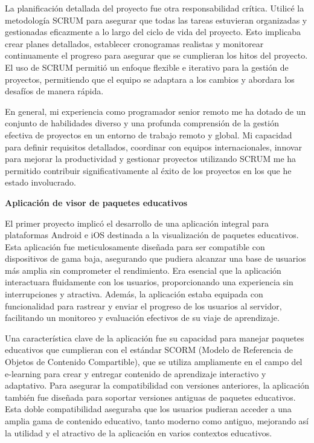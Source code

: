\documentclass[a4paper,10pt]{article}
\newcommand{\cvsubsubsection}[1]{
\begin{tcolorbox}[colback=gray!10, colframe=gray!10, boxrule=0pt, arc=0mm, outer arc=0mm, width=\textwidth, boxsep=0pt, left=4mm, right=4mm, top=1mm, bottom=1mm]
  \textbf{#1}
\end{tcolorbox}
\vspace{1mm}
}
\begin{document}
La planificación detallada del proyecto fue otra responsabilidad crítica. Utilicé la metodología SCRUM para asegurar que todas las tareas estuvieran organizadas y gestionadas eficazmente a lo largo del ciclo de vida del proyecto. Esto implicaba crear planes detallados, establecer cronogramas realistas y monitorear continuamente el progreso para asegurar que se cumplieran los hitos del proyecto. El uso de SCRUM permitió un enfoque flexible e iterativo para la gestión de proyectos, permitiendo que el equipo se adaptara a los cambios y abordara los desafíos de manera rápida.

En general, mi experiencia como programador senior remoto me ha dotado de un conjunto de habilidades diverso y una profunda comprensión de la gestión efectiva de proyectos en un entorno de trabajo remoto y global. Mi capacidad para definir requisitos detallados, coordinar con equipos internacionales, innovar para mejorar la productividad y gestionar proyectos utilizando SCRUM me ha permitido contribuir significativamente al éxito de los proyectos en los que he estado involucrado.

\cvsubsubsection{Aplicación de visor de paquetes educativos}
El primer proyecto implicó el desarrollo de una aplicación integral para plataformas Android e iOS destinada a la visualización de paquetes educativos. Esta aplicación fue meticulosamente diseñada para ser compatible con dispositivos de gama baja, asegurando que pudiera alcanzar una base de usuarios más amplia sin comprometer el rendimiento. Era esencial que la aplicación interactuara fluidamente con los usuarios, proporcionando una experiencia sin interrupciones y atractiva. Además, la aplicación estaba equipada con funcionalidad para rastrear y enviar el progreso de los usuarios al servidor, facilitando un monitoreo y evaluación efectivos de su viaje de aprendizaje.

Una característica clave de la aplicación fue su capacidad para manejar paquetes educativos que cumplieran con el estándar SCORM (Modelo de Referencia de Objetos de Contenido Compartible), que se utiliza ampliamente en el campo del e-learning para crear y entregar contenido de aprendizaje interactivo y adaptativo. Para asegurar la compatibilidad con versiones anteriores, la aplicación también fue diseñada para soportar versiones antiguas de paquetes educativos. Esta doble compatibilidad aseguraba que los usuarios pudieran acceder a una amplia gama de contenido educativo, tanto moderno como antiguo, mejorando así la utilidad y el atractivo de la aplicación en varios contextos educativos.
\end{document}
